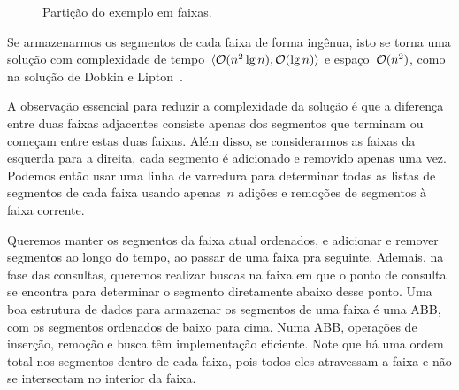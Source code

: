 \documentclass[main.tex]{subfiles}
\begin{document}
\begin{figure}[h]
\centering
{}
\caption{Partição do exemplo em faixas.} \label{fig:slabs}
\end{figure}

Se armazenarmos os segmentos de cada faixa de forma ingênua, isto se torna uma solução com complexidade de tempo~$\langle\mathcal{O}(n^2 \lg n), \mathcal{O}(\lg n)\rangle$ e espaço~$\mathcal{O}(n^2)$, como na solução de Dobkin e Lipton~\cite{DobkinL76}.

A observação essencial para reduzir a complexidade da solução é que a diferença entre duas faixas adjacentes consiste apenas dos segmentos que terminam ou começam entre estas duas faixas. Além disso, se considerarmos as faixas da esquerda para a direita, cada segmento é adicionado e removido apenas uma vez. Podemos então usar uma linha de varredura para determinar todas as listas de segmentos de cada faixa usando apenas~$n$ adições e remoções de segmentos à faixa corrente.

Queremos manter os segmentos da faixa atual ordenados, e adicionar e remover segmentos ao longo do tempo, ao passar de uma faixa pra seguinte. Ademais, na fase das consultas, queremos realizar buscas na faixa em que o ponto de consulta se encontra para determinar o segmento diretamente abaixo desse ponto.
Uma boa estrutura de dados para armazenar os segmentos de uma faixa é uma ABB, com os segmentos ordenados de baixo para cima. Numa ABB, operações de inserção, remoção e busca têm implementação eficiente.
Note que há uma ordem total nos segmentos dentro de cada faixa, pois todos eles atravessam a faixa e não se intersectam no interior da faixa.
\end{document}

